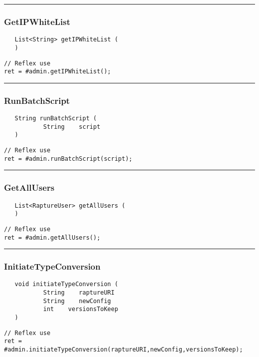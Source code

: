 \rule{15cm}{2pt}
\subsubsection{GetIPWhiteList}
\label{Api:GetIPWhiteList}
\begin{verbatim}
   List<String> getIPWhiteList (
   )
\end{verbatim}
\begin{lstlisting}[language=reflex]
// Reflex use
ret = #admin.getIPWhiteList();
\end{lstlisting}



\rule{15cm}{2pt}
\subsubsection{RunBatchScript}
\label{Api:RunBatchScript}
\begin{verbatim}
   String runBatchScript (
           String    script
   )
\end{verbatim}
\begin{lstlisting}[language=reflex]
// Reflex use
ret = #admin.runBatchScript(script);
\end{lstlisting}



\rule{15cm}{2pt}
\subsubsection{GetAllUsers}
\label{Api:GetAllUsers}
\begin{verbatim}
   List<RaptureUser> getAllUsers (
   )
\end{verbatim}
\begin{lstlisting}[language=reflex]
// Reflex use
ret = #admin.getAllUsers();
\end{lstlisting}



\rule{15cm}{2pt}
\subsubsection{InitiateTypeConversion}
\label{Api:InitiateTypeConversion}
\begin{verbatim}
   void initiateTypeConversion (
           String    raptureURI
           String    newConfig
           int    versionsToKeep
   )
\end{verbatim}
\begin{lstlisting}[language=reflex]
// Reflex use
ret = #admin.initiateTypeConversion(raptureURI,newConfig,versionsToKeep);
\end{lstlisting}



